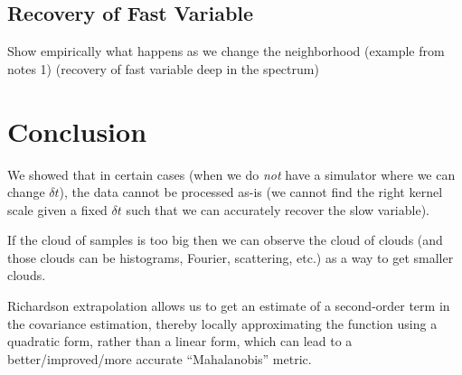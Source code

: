 \documentclass[1p]{elsarticle}
\begin{document}
\subsection{Recovery of Fast Variable}

Show empirically what happens as we change the neighborhood (example from notes 1) (recovery of fast variable deep in the spectrum)

\section{Conclusion}

We showed that in certain cases (when we do {\em not} have a simulator where we can change $\delta t$), the data cannot be processed as-is (we cannot find the right kernel scale given a fixed $\delta t$ such that we can accurately recover the slow variable). 

If the cloud of samples is too big then we can observe the cloud of clouds (and those clouds can be histograms, Fourier, scattering, etc.) as a way to get smaller clouds. 


Richardson extrapolation allows us to get an estimate of a second-order term in the covariance estimation, thereby locally approximating the function using a quadratic form, rather than a linear form,  which can lead to a better/improved/more accurate ``Mahalanobis'' metric. 
\end{document}
